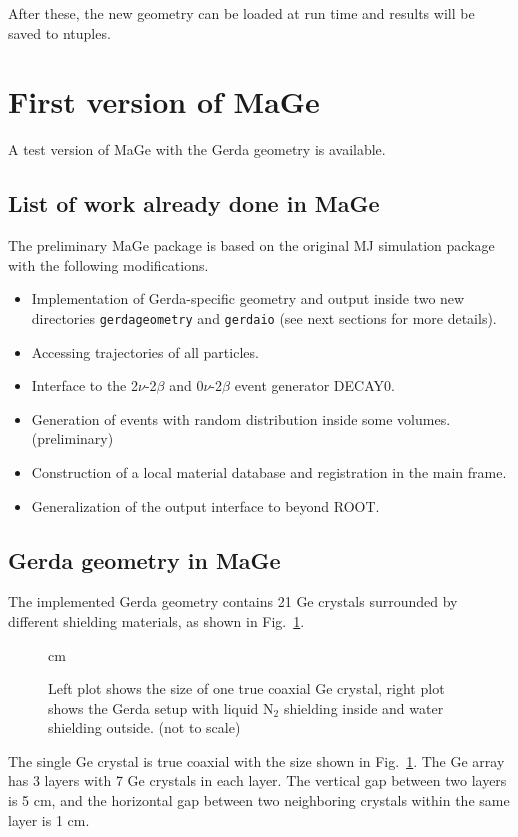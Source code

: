 \documentclass[a4paper,12pt,twoside]{article}
\begin{document}
After these, the new geometry can be loaded at run time and
results will be saved to ntuples.


\section{First version of MaGe}
\label{sec:first-version-of-mage}

A test version of MaGe with the Gerda geometry is available.

\subsection{List of work already done in MaGe}
The preliminary MaGe package is based on the original MJ simulation package
with the following modifications.
\begin{itemize}
\item Implementation of Gerda-specific geometry and output inside two
new directories {\tt gerdageometry} and {\tt gerdaio} (see next sections
 for more details).
\item Accessing trajectories of all particles.
\item Interface to the 2$\nu$-2$\beta$ and 0$\nu$-2$\beta$ event generator DECAY0.
\item Generation of events with random distribution inside some volumes.
(preliminary)
\item Construction of a local material database and registration in 
the main frame.
\item Generalization of the output interface to beyond ROOT.
\end{itemize}

\subsection{Gerda geometry in MaGe}

The implemented Gerda geometry contains 21 Ge crystals surrounded 
by different shielding materials, as shown in Fig.~\ref{fig:gerdasetup}.
\begin{figure}[h]
\centerline{  \epsfxsize=2.0in  
              \epsfxsize=3.5in  }
 cm
\caption{Left plot shows the size of one true coaxial Ge crystal,
right plot shows the Gerda setup with liquid N$_{2}$ shielding inside and
water shielding outside. (not to scale)}
\label{fig:gerdasetup}
\end{figure}
The single Ge crystal is true coaxial with the size shown 
in Fig.~\ref{fig:gerdasetup}.
The Ge array has 3 layers with 7 Ge crystals in each layer.
The vertical gap between two layers is 5 cm, and the horizontal
gap between two neighboring crystals within the same layer is 1 cm.
\end{document}

